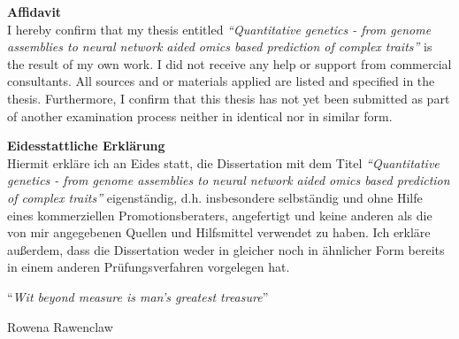 \documentclass[
12pt, %
english, %
doublespacing, %
headsepline, %
chapterinoneline, %
]{MastersDoctoralThesis} %
\begin{document}
\begin{declaration}
  \noindent
  {\LARGE\textbf{Affidavit}} \\
  \noindent
  I hereby confirm that my thesis entitled \textit{``Quantitative genetics -
  from genome assemblies to neural network aided omics based
  prediction of complex traits''} is the result of my own work. I did not
  receive any help or support from commercial consultants. All sources
  and  or materials applied are listed and specified in the thesis.
  Furthermore, I confirm that this thesis has not yet been submitted
  as part of another examination process neither in identical nor in
  similar form.

  \vspace{0.1\textheight}
  \noindent
  {\LARGE\textbf{Eidesstattliche Erkl\"{a}rung}}\\
  \noindent
  Hiermit erkläre ich an Eides statt, die Dissertation mit dem Titel \textit{``Quantitative genetics -
  from genome assemblies to neural network aided omics based
  prediction of complex traits''} 
  eigenst\"{a}ndig, d.h. insbesondere selbst\"{a}ndig und ohne Hilfe eines
  kommerziellen Promotionsberaters, angefertigt und keine anderen als
  die von mir angegebenen Quellen und Hilfsmittel verwendet zu haben.
  Ich erkl\"{a}re außerdem, dass die Dissertation weder in gleicher noch
  in \"{a}hnlicher Form bereits in einem anderen Pr\"{u}fungsverfahren
  vorgelegen hat.
\end{declaration}
\newpage



\vspace*{0.2\textheight}

\noindent\enquote{\itshape Wit beyond measure is man's greatest treasure}\bigbreak

\hfill Rowena Rawenclaw


\end{document}
